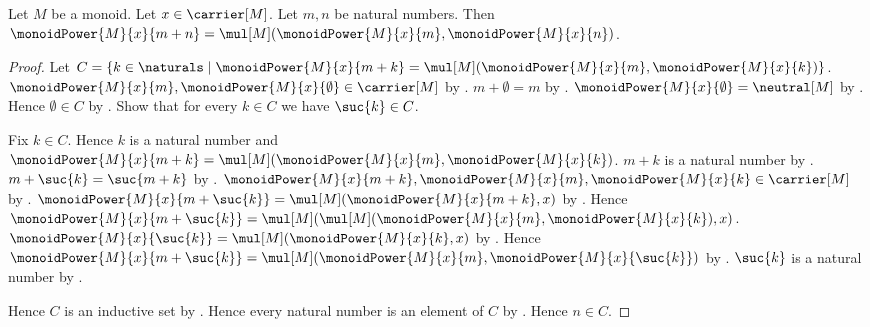 \begin{theorem}\label{monoid_power_addition}
    Let $M$ be a monoid.
    Let $x\in\carrier[M]$.
    Let $m,n$ be natural numbers.
    Then $\monoidPower{M}{x}{m+n}=
        \mul[M](\monoidPower{M}{x}{m},\monoidPower{M}{x}{n})$.
\end{theorem}
\begin{proof}
    Let $C=\{k\in\naturals\mid
        \text{$\monoidPower{M}{x}{m+k}=
            \mul[M](\monoidPower{M}{x}{m},
                \monoidPower{M}{x}{k})$}\}$.
    $\monoidPower{M}{x}{m},\monoidPower{M}{x}{\emptyset}
        \in\carrier[M]$ by
        .
    $m+\emptyset=m$ by .
    $\monoidPower{M}{x}{\emptyset}=\neutral[M]$ by
        .
    Hence $\emptyset\in C$ by
        .
    Show that for every $k\in C$ we have $\suc{k}\in C$.
    \begin{subproof}
        Fix $k\in C$.
        Hence $k$ is a natural number and
            $\monoidPower{M}{x}{m+k}=
                \mul[M](\monoidPower{M}{x}{m},
                    \monoidPower{M}{x}{k})$.
        $m+k$ is a natural number by
            .
        $m+\suc{k}=\suc{m+k}$ by
            .
        $\monoidPower{M}{x}{m+k},\monoidPower{M}{x}{m},
            \monoidPower{M}{x}{k}\in\carrier[M]$ by
            .
        $\monoidPower{M}{x}{m+\suc{k}}=
            \mul[M](\monoidPower{M}{x}{m+k},x)$ by
            .
        Hence $\monoidPower{M}{x}{m+\suc{k}}=
            \mul[M](
                \mul[M](\monoidPower{M}{x}{m},
                    \monoidPower{M}{x}{k}),x)$.
        $\monoidPower{M}{x}{\suc{k}}=
            \mul[M](\monoidPower{M}{x}{k},x)$ by
            .
        Hence $\monoidPower{M}{x}{m+\suc{k}}=
            \mul[M](\monoidPower{M}{x}{m},
                \monoidPower{M}{x}{\suc{k}})$ by
            .
        $\suc{k}$ is a natural number by .
    \end{subproof}
    Hence $C$ is an inductive set by .
    Hence every natural number is an element of $C$ by
        .
    Hence $n\in C$.
\end{proof}

